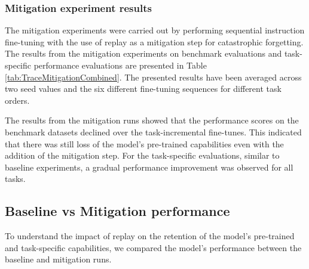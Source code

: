 \subsubsection{Mitigation experiment results}
The mitigation experiments were carried out by performing sequential instruction fine-tuning with the use of replay as a mitigation step for catastrophic forgetting. The results from the mitigation experiments on benchmark evaluations and task-specific performance evaluations are presented in Table \ref{tab:TraceMitigationCombined}. The presented results have been averaged across two seed values and the six different fine-tuning sequences for different task orders.

% 

The results from the mitigation runs showed that the performance scores on the benchmark datasets declined over the task-incremental fine-tunes. This indicated that there was still loss of the model's pre-trained capabilities even with the addition of the mitigation step.
For the task-specific evaluations, similar to baseline experiments, a gradual performance improvement was observed for all tasks. 

\subsection{Baseline vs Mitigation performance}
To understand the impact of replay on the retention of the model's pre-trained and task-specific capabilities, we compared the model's performance between the baseline and mitigation runs. 

